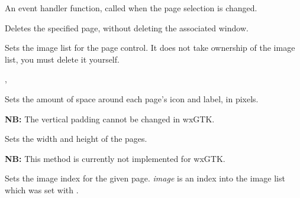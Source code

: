 


\label{wxnotebookonselchange}


An event handler function, called when the page selection is changed.




\label{wxnotebookremovepage}


Deletes the specified page, without deleting the associated window.


\label{wxnotebooksetimagelist}


Sets the image list for the page control. It does not take
ownership of the image list, you must delete it yourself.


,


\label{wxnotebooksetpadding}


Sets the amount of space around each page's icon and label, in pixels.

{\bf NB:} The vertical padding cannot be changed in wxGTK.


\label{wxnotebooksetpagesize}


Sets the width and height of the pages.

{\bf NB:} This method is currently not implemented for wxGTK.


\label{wxnotebooksetpageimage}


Sets the image index for the given page. {\it image} is an index into
the image list which was set with .


